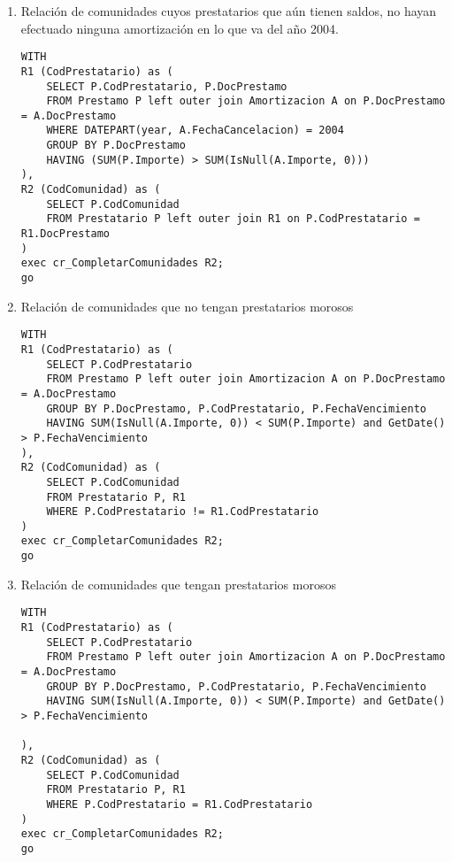 \begin{enumerate}
\item Relación de comunidades cuyos prestatarios que aún tienen saldos, no hayan
efectuado ninguna amortización en lo que va del año 2004.
\begin{verbatim}
WITH
R1 (CodPrestatario) as (
    SELECT P.CodPrestatario, P.DocPrestamo
    FROM Prestamo P left outer join Amortizacion A on P.DocPrestamo = A.DocPrestamo
    WHERE DATEPART(year, A.FechaCancelacion) = 2004
    GROUP BY P.DocPrestamo
    HAVING (SUM(P.Importe) > SUM(IsNull(A.Importe, 0)))
),
R2 (CodComunidad) as (
    SELECT P.CodComunidad
    FROM Prestatario P left outer join R1 on P.CodPrestatario = R1.DocPrestamo
)
exec cr_CompletarComunidades R2;
go
\end{verbatim}

\item Relación de comunidades que no tengan prestatarios morosos
\begin{verbatim}
WITH
R1 (CodPrestatario) as (
    SELECT P.CodPrestatario
    FROM Prestamo P left outer join Amortizacion A on P.DocPrestamo = A.DocPrestamo
    GROUP BY P.DocPrestamo, P.CodPrestatario, P.FechaVencimiento
    HAVING SUM(IsNull(A.Importe, 0)) < SUM(P.Importe) and GetDate() > P.FechaVencimiento
),
R2 (CodComunidad) as (
    SELECT P.CodComunidad
    FROM Prestatario P, R1
    WHERE P.CodPrestatario != R1.CodPrestatario
)
exec cr_CompletarComunidades R2;
go
\end{verbatim}

\item Relación de comunidades que tengan prestatarios morosos
\begin{verbatim}
WITH
R1 (CodPrestatario) as (
    SELECT P.CodPrestatario
    FROM Prestamo P left outer join Amortizacion A on P.DocPrestamo = A.DocPrestamo
    GROUP BY P.DocPrestamo, P.CodPrestatario, P.FechaVencimiento
    HAVING SUM(IsNull(A.Importe, 0)) < SUM(P.Importe) and GetDate() > P.FechaVencimiento

),
R2 (CodComunidad) as (
    SELECT P.CodComunidad
    FROM Prestatario P, R1
    WHERE P.CodPrestatario = R1.CodPrestatario
)
exec cr_CompletarComunidades R2;
go
\end{verbatim}


\end{enumerate}
